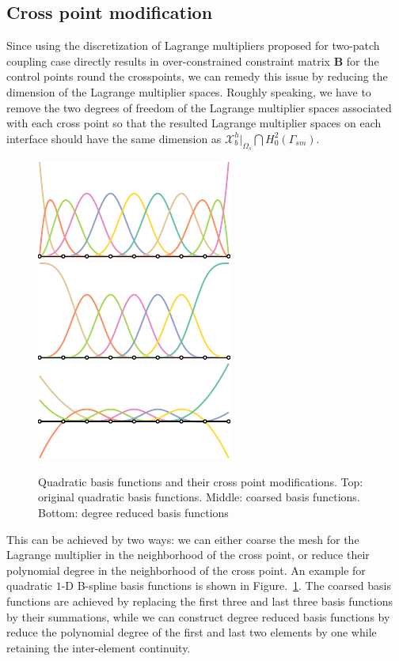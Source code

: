 \documentclass[preprint,12pt]{elsarticle}
\begin{document}
\subsection{Cross point modification}
Since using the discretization of Lagrange multipliers proposed for two-patch coupling case directly results in over-constrained constraint matrix $\mathbf{B}$ for the control points round the crosspoints, we can remedy this issue by reducing the dimension of the Lagrange multiplier spaces. Roughly speaking, we have to remove the two degrees of freedom of the Lagrange multiplier spaces associated with each cross point so that the resulted Lagrange multiplier spaces on each interface should have the same dimension as $\mathcal{X}_b^h\vert_{\Omega_s}\bigcap{}H_0^2(\Gamma_{sm})$.\par
\begin{figure}[hbt]
	\centering
    \includegraphics[width=.5\linewidth]{basis_original}\\
    \includegraphics[width=.5\linewidth]{basis_coarse}\\
    \includegraphics[width=.5\linewidth]{basis_reduce_degree}
	\caption{Quadratic basis functions and their cross point modifications. Top: original quadratic basis functions. Middle: coarsed basis functions. Bottom: degree reduced basis functions}\label{fig:boundary_modification}
\end{figure}
This can be achieved by two ways: we can either coarse the mesh for the Lagrange multiplier in the neighborhood of the cross point, or reduce their polynomial degree in the neighborhood of the cross point. An example for quadratic $1$-D B-spline basis functions is shown in Figure.~\ref{fig:boundary_modification}. The coarsed basis functions are achieved by replacing the first three and last three basis functions by their summations, while we can construct degree reduced basis functions by reduce the polynomial degree of the first and last two elements by one while retaining the inter-element continuity.\par
\end{document}
